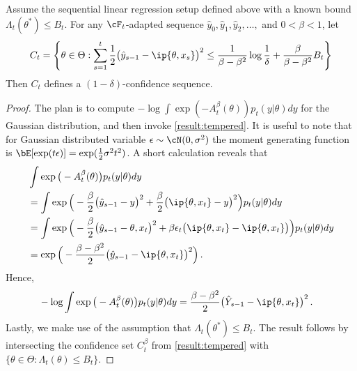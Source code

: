 \begin{lemma} Assume the sequential linear regression setup defined above with a known bound $\Lambda_t(\theta^*) \leq B_t$. For any $\cF_t$-adapted sequence $\hat y_0, \hat y_1, \hat y_2, \dots,$ and  $0 < \beta < 1$, let
    \begin{align*}
        C_t = \left\{ \theta \in \Theta : \sum_{s=1}^t \frac{1}{2} \big(\hat y_{s-1} - \ip{\theta, x_s}\big)^2 \leq \frac{1}{\beta - \beta^2 } \log \frac{1}{\delta} + \frac{\beta}{\beta - \beta^2} B_t \right\}
    \end{align*}
    Then $C_t$ defines a $(1-\delta)$-confidence sequence.
\end{lemma}
\begin{proof}
The plan is to compute  $- \log \int \exp(- A_t^\beta(\theta)) p_t(y|\theta) dy$ for the Gaussian distribution, and then invoke \cref{result:tempered}. It is useful to note that for Gaussian distributed variable $\epsilon \sim \cN(0, \sigma^2)$ the moment generating function is $\bE[\exp(t \epsilon)] = \exp(\frac{1}{2}\sigma^2 t^2)$.
A short calculation reveals that 
\begin{align*}
    & \int \exp\big(- A_t^\beta(\theta)\big) p_t(y|\theta) dy\\
    &= \int \exp\Big(-  \frac{\beta}{2} \big(\hat y_{s-1} - y\big)^2 + \frac{\beta}{2} \big(\ip{\theta,x_t} - y\big)^2 \Big)  p_t(y|\theta) dy\\
    &= \int \exp\Big(-  \frac{\beta}{2} \big(\hat y_{s-1} - {\theta,x_t}\big)^2 + \beta \epsilon_t \big(\ip{\theta,x_t} - \ip{\theta,x_t}\big) \Big)  p_t(y|\theta) dy\\
    &= \exp\Big(-  \frac{\beta - \beta^2}{2} \big(\hat y_{s-1} - \ip{\theta,x_t}\big)^2 \Big) \,.
\end{align*}
Hence,
\begin{align*}
    & - \log \int \exp\big(- A_t^\beta(\theta)\big) p_t(y|\theta) dy =  \frac{\beta - \beta^2}{2} \big(\hat Y_{s-1} - \ip{\theta,x_t}\big)^2 \,.
\end{align*}
Lastly, we make use of the assumption that $\Lambda_t(\theta^*) \leq B_t$. The result follows by intersecting the confidence set $C_t^\beta$ from \cref{result:tempered} with  $\{\theta \in \Theta : \Lambda_t(\theta) \leq B_t\}$.
\end{proof}

